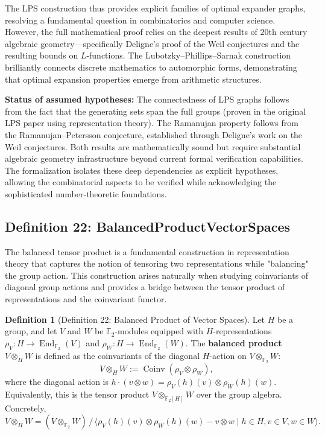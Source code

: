 \documentclass[11pt]{article}
\theoremstyle{plain}
\theoremstyle{definition}
\newtheorem*{definition}{Definition}
\theoremstyle{remark}
\begin{document}
The LPS construction thus provides explicit families of optimal expander graphs, resolving a fundamental question in combinatorics and computer science. However, the full mathematical proof relies on the deepest results of 20th century algebraic geometry---specifically Deligne's proof of the Weil conjectures and the resulting bounds on $L$-functions. The Lubotzky--Phillips--Sarnak construction brilliantly connects discrete mathematics to automorphic forms, demonstrating that optimal expansion properties emerge from arithmetic structures.

\textbf{Status of assumed hypotheses:} The connectedness of LPS graphs follows from the fact that the generating sets span the full groups (proven in the original LPS paper using representation theory). The Ramanujan property follows from the Ramanujan--Petersson conjecture, established through Deligne's work on the Weil conjectures. Both results are mathematically sound but require substantial algebraic geometry infrastructure beyond current formal verification capabilities. The formalization isolates these deep dependencies as explicit hypotheses, allowing the combinatorial aspects to be verified while acknowledging the sophisticated number-theoretic foundations.

\vspace{1em}

\subsection{Definition 22: BalancedProductVectorSpaces}

The balanced tensor product is a fundamental construction in representation theory that captures the notion of tensoring two representations while "balancing" the group action. This construction arises naturally when studying coinvariants of diagonal group actions and provides a bridge between the tensor product of representations and the coinvariant functor.

\begin{definition}[Definition 22: Balanced Product of Vector Spaces]
Let $H$ be a group, and let $V$ and $W$ be $\mathbb{F}_2$-modules equipped with $H$-representations $\rho_V : H \to \operatorname{End}_{\mathbb{F}_2}(V)$ and $\rho_W : H \to \operatorname{End}_{\mathbb{F}_2}(W)$. The \textbf{balanced product} $V \otimes_H W$ is defined as the coinvariants of the diagonal $H$-action on $V \otimes_{\mathbb{F}_2} W$:
\[
V \otimes_H W := \operatorname{Coinv}(\rho_V \otimes \rho_W),
\]
where the diagonal action is $h \cdot (v \otimes w) = \rho_V(h)(v) \otimes \rho_W(h)(w)$. Equivalently, this is the tensor product $V \otimes_{\mathbb{F}_2[H]} W$ over the group algebra. Concretely,
\[
V \otimes_H W = (V \otimes_{\mathbb{F}_2} W) \,/\, \langle \rho_V(h)(v) \otimes \rho_W(h)(w) - v \otimes w \mid h \in H, v \in V, w \in W \rangle.
\]
\end{definition}
\end{document}
